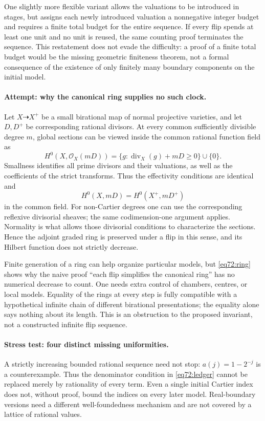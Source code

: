 \documentclass[11pt,a4paper]{article}
\numberwithin{equation}{section}
\begin{document}
One slightly more flexible variant allows the valuations to be introduced
in stages, but assigns each newly introduced valuation a nonnegative
integer budget and requires a finite total budget for the entire sequence.
If every flip spends at least one unit and no unit is reused, the same
counting proof terminates the sequence. This restatement does not evade
the difficulty: a proof of a finite total budget would be the missing
geometric finiteness theorem, not a formal consequence of the existence of
only finitely many boundary components on the initial model.

\paragraph{Attempt: why the canonical ring supplies no such clock.}
Let $X\dashrightarrow X^+$ be a small birational map of normal projective
varieties, and let $D,D^+$ be corresponding rational divisors. At every
common sufficiently divisible degree $m$, global sections can be viewed
inside the common rational function field as
\[
 H^0(X,\mathcal O_X(mD))=
 \{g:\operatorname{div}_X(g)+mD\geq0\}\cup\{0\}.
\]
Smallness identifies all prime divisors and their valuations, as well as
the coefficients of the strict transforms. Thus the effectivity conditions
are identical and
\begin{equation}\label{eq72:ring}
 H^0(X,mD)=H^0(X^+,mD^+)
\end{equation}
in the common field. For non-Cartier degrees one can use the corresponding
reflexive divisorial sheaves; the same codimension-one argument applies.
Normality is what allows those divisorial conditions to characterize the
sections. Hence the adjoint graded ring is preserved under a flip in this
sense, and its Hilbert function does not strictly decrease.

Finite generation of a ring can help organize particular models, but
\eqref{eq72:ring} shows why the naive proof ``each flip simplifies the
canonical ring'' has no numerical decrease to count. One needs extra
control of chambers, centres, or local models. Equality of the rings at
every step is fully compatible with a hypothetical infinite chain of
different birational presentations; the equality alone says nothing about
its length. This is an obstruction to the proposed invariant, not a
constructed infinite flip sequence.

\paragraph{Stress test: four distinct missing uniformities.}
A strictly increasing bounded rational sequence need not stop:
$a(j)=1-2^{-j}$ is a counterexample. Thus the denominator condition in
\eqref{eq72:ledger} cannot be replaced merely by rationality of every term.
Even a single initial Cartier index does not, without proof, bound the
indices on every later model. Real-boundary versions need a different
well-foundedness mechanism and are not covered by a lattice of rational
values.
\end{document}
